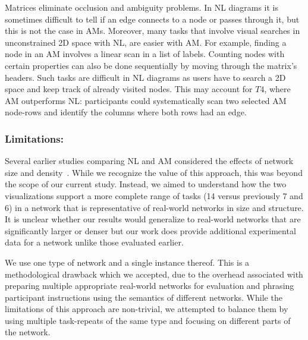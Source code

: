 Matrices eliminate occlusion and ambiguity problems. In NL diagrams it is sometimes difficult to tell if an edge connects to a node or passes through it, but this is not the case in AMs.  Moreover, many tasks that involve visual searches in unconstrained 2D space with NL, are easier with AM.
For example, finding a node in an AM involves a linear scan in 
a list of labels. Counting nodes with certain properties can also be done sequentially by moving through the matrix's headers. Such tasks are difficult in NL diagrams as users have to search a 2D space and keep track of already visited nodes.  This may account for $T4$, where AM outperforms NL: participants could systematically scan two selected AM node-rows and identify the columns where both rows had an edge. 

\subsubsection{Limitations:}

Several earlier studies comparing NL and AM considered the effects of network size and density~\cite{ghoniem2005readability,keller2006matrices}. While we recognize the value of this approach, this was beyond the scope of our current study. Instead, we aimed to understand how the two visualizations support a more complete range of tasks (14 versus previously 7 and 6) in a network that is representative of real-world networks in size and structure. It is unclear whether our results would generalize to real-world networks that are significantly larger or denser but our work does provide additional experimental data for a network unlike those evaluated earlier. 

We use one type of network and a single instance thereof. This is a methodological drawback which we accepted, due to the overhead associated with preparing multiple appropriate real-world networks for evaluation and phrasing participant instructions using the semantics of different networks. 
While the limitations of this approach are non-trivial, we attempted to balance them by using multiple task-repeats of the same type and focusing on different parts of the network.


